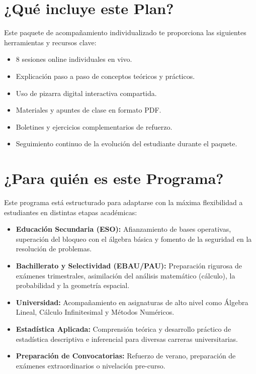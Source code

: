 \documentclass[11pt,a4paper]{article}
\begin{document}
\section{¿Qué incluye este Plan?}
Este paquete de acompañamiento individualizado te proporciona las siguientes herramientas y recursos clave:
\begin{itemize}
    \item 8 sesiones online individuales en vivo.
    \item Explicación paso a paso de conceptos teóricos y prácticos.
    \item Uso de pizarra digital interactiva compartida.
    \item Materiales y apuntes de clase en formato PDF.
    \item Boletines y ejercicios complementarios de refuerzo.
    \item Seguimiento continuo de la evolución del estudiante durante el paquete.
\end{itemize}

\section{¿Para quién es este Programa?}
Este programa está estructurado para adaptarse con la máxima flexibilidad a estudiantes en distintas etapas académicas:
\begin{itemize}
    \item \textbf{Educación Secundaria (ESO):} Afianzamiento de bases operativas, superación del bloqueo con el álgebra básica y fomento de la seguridad en la resolución de problemas.
    \item \textbf{Bachillerato y Selectividad (EBAU/PAU):} Preparación rigurosa de exámenes trimestrales, asimilación del análisis matemático (cálculo), la probabilidad y la geometría espacial.
    \item \textbf{Universidad:} Acompañamiento en asignaturas de alto nivel como Álgebra Lineal, Cálculo Infinitesimal y Métodos Numéricos.
    \item \textbf{Estadística Aplicada:} Comprensión teórica y desarrollo práctico de estadística descriptiva e inferencial para diversas carreras universitarias.
    \item \textbf{Preparación de Convocatorias:} Refuerzo de verano, preparación de exámenes extraordinarios o nivelación pre-curso.
\end{itemize}

\newpage
\end{document}
